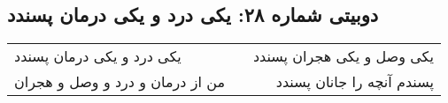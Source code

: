 \begin{center}
\section*{دوبیتی شماره ۲۸: یکی درد و یکی درمان پسندد}
\label{sec:028}
\begin{longtable}{l p{0.5cm} r}
یکی درد و یکی درمان پسندد
&&
یکی وصل و یکی هجران پسندد
\\
من از درمان و درد و وصل و هجران
&&
پسندم آنچه را جانان پسندد
\\
\end{longtable}
\end{center}
